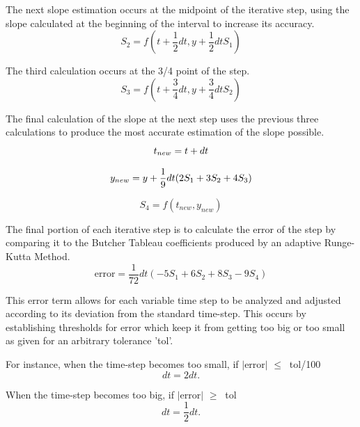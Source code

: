 \documentclass[letterpaper, twoside]{article}
\numberwithin{equation}{section}
\begin{document}
The next slope estimation occurs at the midpoint of the iterative step, using the slope calculated at the beginning of the interval to increase its accuracy.
\begin{equation} \label{eq: S_2}
  S_2 = f(t + \frac{1}{2} dt,y + \frac{1}{2} dt S_1)
\end{equation}

The third calculation occurs at the 3/4  point of the step.
\begin{equation} \label{eq: S_3}
  S_3 = f(t + \frac{3}{4} dt,y+\frac{3}{4} dt S_2)
\end{equation}

The final calculation of the slope at the next step uses the previous three calculations to produce the most accurate estimation of the slope possible. 
\begin{equation} \label{eq: t_{new}}
  t_{new} = t + dt
\end{equation}

\begin{equation} \label{eq: y_{new}}
  y_{new} = y + \frac{1}{9} dt (2 S_1 + 3 S_2 + 4 S_3)
\end{equation}

\begin{equation} \label{eq: S_4}
  S_4 = f(t_{new},y_{new})
\end{equation}

The final portion of each iterative step is to calculate the error of the step by comparing it to the Butcher Tableau coefficients produced by an adaptive Runge-Kutta Method.
\begin{equation} \label{eq: errorfunction}
  \mathrm{error} = \frac{1}{72} dt (-5 S_1 + 6 S_2 + 8 S_3 - 9 S_4)
\end{equation}

This error term allows for each variable time step to be analyzed and adjusted according to its deviation from the standard time-step. This occurs by establishing thresholds for error which keep it from getting too big or too small as given for an arbitrary tolerance 'tol'.

For instance, when the time-step becomes too small, if $|$error$|$ $ \leq\ $ tol/100
\begin{equation}
  dt = 2 dt.
\end{equation}

When the time-step becomes too big, if $|$error$|$ $ \geq\ $ tol
\begin{equation}
  dt = \frac{1}{2} dt.
\end{equation}
\end{document}
